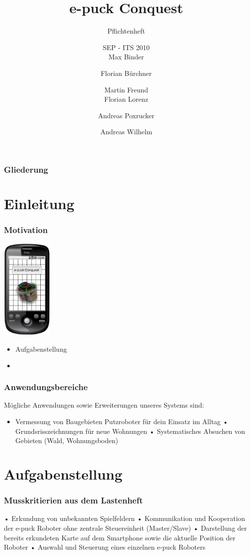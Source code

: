 \documentclass{beamer}
\title[Pflichtenheft] %
{e-puck Conquest}
\subtitle
{Pflichtenheft}
\author[Autor, Anders] %
{SEP - ITS 2010 \\ Max Binder \and Florian Bürchner \and Martin Freund
	\\ Florian Lorenz \and Andreas Poxrucker \and Andreas Wilhelm}
\institute[Universität Passau] %
{
  Fakultät für Informatik und Mathematik\\
  Universität Passau}
\begin{document}
\begin{frame}
  \titlepage
\end{frame}

\begin{frame}
  \frametitle{Gliederung}
  \tableofcontents
\end{frame}

\section{Einleitung}

\begin{frame}
  \frametitle{Motivation}

	\includegraphics[height=5cm]{logo.eps} 
	\begin{itemize}
		\item Aufgabenstellung
		\item 
	\end{itemize}
\end{frame}

\begin{frame}
  \frametitle{Anwendungsbereiche}

Mögliche Anwendungen sowie Erweiterungen unseres Systems sind:

	\begin{itemize}
	    \item	Vermessung von Baugebieten
        Putzroboter für dein Einsatz im Alltag
	•	Grundsrisszeichnungen für neue Wohnungen
	•	Systematisches Absuchen von Gebieten (Wald, Wohnungsboden)	
	\end{itemize}

\end{frame}

\section{Aufgabenstellung}

\begin{frame}
  \frametitle{Musskritierien aus dem Lastenheft}
  
	\begin{itemize}
	•	Erkundung von unbekannten Spielfeldern
	•	Kommunikation und Kooperation der e-puck Roboter ohne zentrale Steuereinheit (Master/Slave)
	•	Darstellung der bereits erkundeten Karte auf dem Smartphone sowie die aktuelle Position der Roboter
	•	Auswahl und Steuerung eines einzelnen e-puck Roboters
	\end{itemize}  
\end{frame}
\end{document}
